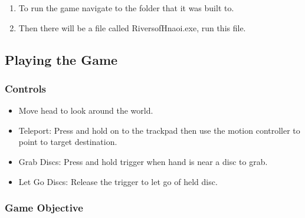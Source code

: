 \begin{appendices}
\begin{enumerate}
	\item To run the game navigate to the folder that it was built to.
	\item Then there will be a file called RiversofHnaoi.exe, run this file.
\end{enumerate}

\subsection{Playing the Game}

\subsubsection{Controls}

\begin{itemize}
	\item Move head to look around the world.
	\item Teleport: Press and hold on to the trackpad then use the motion controller to point to target destination.
	\item Grab Discs: Press and hold trigger when hand is near a disc to grab.
	\item Let Go Discs: Release the trigger to let go of held disc.
\end{itemize}

\subsubsection{Game Objective}


\end{appendices}
